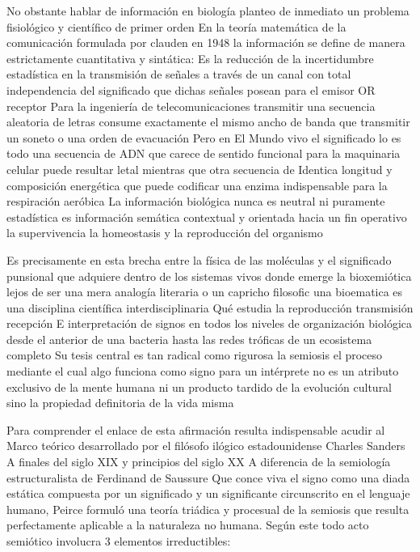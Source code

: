 No obstante hablar de información en biología planteo de inmediato un problema fisiológico y científico de primer orden 
En la teoría matemática de la comunicación formulada por clauden en 1948 la información se define de manera estrictamente cuantitativa y sintática: Es la reducción de la incertidumbre estadística en la transmisión de señales a través de un canal con total independencia del significado que dichas señales posean para el emisor OR receptor
Para la ingeniería de telecomunicaciones transmitir una secuencia aleatoria de letras consume exactamente el mismo ancho de banda que transmitir un soneto o una orden de evacuación
Pero en El Mundo vivo el significado lo es todo una secuencia de ADN que carece de sentido funcional para la maquinaria celular puede resultar letal mientras que otra secuencia de Identica longitud y composición energética que puede codificar una enzima indispensable para la respiración aeróbica
La información biológica nunca es neutral ni puramente estadística es información semática contextual y orientada hacia un fin operativo la supervivencia la homeostasis y la reproducción del organismo 

Es precisamente en esta brecha entre la física de las moléculas y el significado punsional que adquiere dentro de los sistemas vivos donde emerge la bioxemiótica lejos de ser una mera analogía literaria o un capricho filosofic una bioematica es una disciplina científica interdisciplinaria Qué estudia la reproducción transmisión recepción E interpretación de signos en todos los niveles de organización biológica desde el anterior de una bacteria hasta las redes tróficas de un ecosistema completo
Su tesis central es tan radical como rigurosa la semiosis el proceso mediante el cual algo funciona como signo para un intérprete no es un atributo exclusivo de la mente humana ni un producto tardido de la evolución cultural sino la propiedad definitoria de la vida misma

Para comprender el enlace de esta afirmación resulta indispensable acudir al Marco teórico desarrollado por el filósofo ilógico estadounidense Charles Sanders A finales del siglo XIX y principios del siglo XX
A diferencia de la semiología estructuralista de Ferdinand de Saussure Que conce viva el signo como una diada estática compuesta por un significado y un significante circunscrito en el lenguaje humano, Peirce formuló una teoría triádica y procesual de la semiosis que resulta perfectamente aplicable a la naturaleza no humana. 
Según este todo acto semiótico involucra 3 elementos irreductibles:

